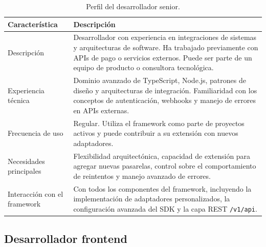\begin{table}[H]
  \centering
  \renewcommand{\arraystretch}{1.2}
  \begin{tabularx}{\textwidth}{|l|X|}
    \hline
    \textbf{Característica} & \textbf{Descripción} \\
    \hline
    Descripción & Desarrollador con experiencia en integraciones de sistemas y arquitecturas de software. Ha trabajado previamente con APIs de pago o servicios externos. Puede ser parte de un equipo de producto o consultora tecnológica. \\
    \hline
    Experiencia técnica & Dominio avanzado de TypeScript, Node.js, patrones de diseño y arquitecturas de integración. Familiaridad con los conceptos de autenticación, webhooks y manejo de errores en APIs externas. \\
    \hline
    Frecuencia de uso & Regular. Utiliza el framework como parte de proyectos activos y puede contribuir a su extensión con nuevos adaptadores. \\
    \hline
    Necesidades principales & Flexibilidad arquitectónica, capacidad de extensión para agregar nuevas pasarelas, control sobre el comportamiento de reintentos y manejo avanzado de errores. \\
    \hline
    Interacción con el framework & Con todos los componentes del framework, incluyendo la implementación de adaptadores personalizados, la configuración avanzada del SDK y la capa REST \texttt{/v1/api}. \\
    \hline
  \end{tabularx}
  \caption{Perfil del desarrollador senior.}
  \label{tab:perfil-senior}
\end{table}

\subsection{Desarrollador frontend}

